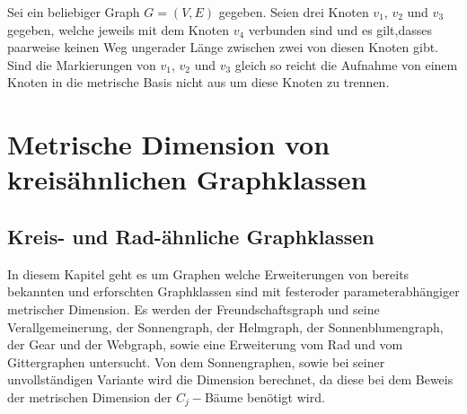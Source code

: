 \begin{lem}
\label{einelementreichtnicht}
Sei ein beliebiger Graph $G=(V,E)$ gegeben. Seien drei Knoten $v_1$, $v_2$ und $v_3$ gegeben, welche jeweils mit dem Knoten $v_4$ verbunden sind und es gilt,dasses paarweise keinen Weg ungerader Länge zwischen zwei von diesen Knoten gibt. Sind die Markierungen von $v_1$, $v_2$ und $v_3$ gleich so reicht die Aufnahme von einem Knoten in die metrische Basis nicht aus um diese Knoten zu trennen.
\end{lem}
\clearpage
\section{Metrische Dimension von kreisähnlichen Graphklassen}
\subsection{Kreis- und Rad-ähnliche Graphklassen}
In diesem Kapitel geht es um Graphen welche Erweiterungen von bereits bekannten und erforschten Graphklassen sind mit festeroder parameterabhängiger metrischer Dimension. Es werden der Freundschaftsgraph und seine Verallgemeinerung, der Sonnengraph, der Helmgraph, der Sonnenblumengraph, der Gear und der Webgraph, sowie eine Erweiterung vom Rad und vom Gittergraphen untersucht.
Von dem Sonnengraphen, sowie bei seiner unvollständigen Variante wird die Dimension berechnet, da diese bei dem Beweis der metrischen Dimension der $C_j-$Bäume benötigt wird.
